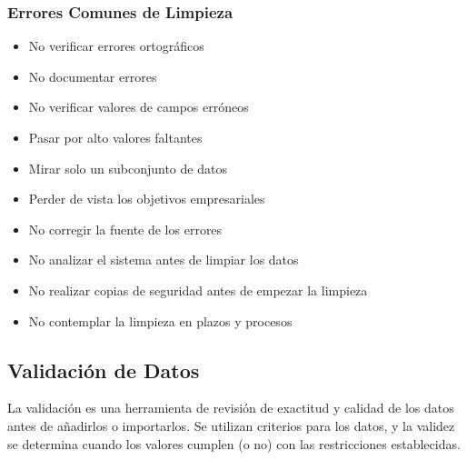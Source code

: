 \subsubsection{Errores Comunes de Limpieza}
\begin{itemize}
    \item {No verificar errores ortográficos}
    \item {No documentar errores}
    \item {No verificar valores de campos erróneos}
    \item {Pasar por alto valores faltantes}
    \item {Mirar solo un subconjunto de datos}
    \item {Perder de vista los objetivos empresariales}
    \item {No corregir la fuente de los errores}
    \item {No analizar el sistema antes de limpiar los datos}
    \item {No realizar copias de seguridad antes de empezar la limpieza}
    \item {No contemplar la limpieza en plazos y procesos}
\end{itemize}


\subsection{Validación de Datos}
La validación es una herramienta de revisión de exactitud y calidad de los datos antes de añadirlos o importarlos. Se utilizan criterios para los datos, y la validez se determina cuando los valores cumplen (o no) con las restricciones establecidas. 

